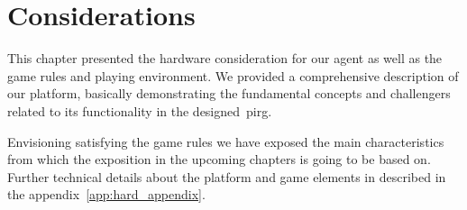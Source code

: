 \section{Considerations}
This chapter presented the hardware consideration for our agent as well as the game rules and playing environment. We provided a comprehensive description of our platform, basically demonstrating the fundamental concepts and challengers related to its functionality in the designed~\gls{pirg}.

Envisioning satisfying the game rules we have exposed the main characteristics from which the exposition in the upcoming chapters is going to be based on. Further technical details about the platform and game elements in described in the appendix~\ref{app:hard_appendix}.